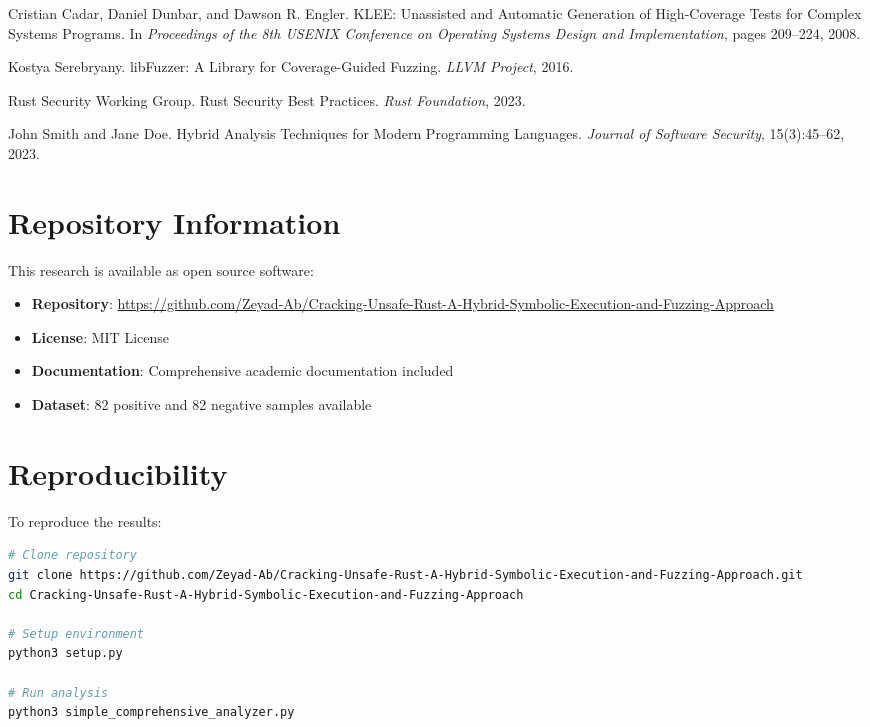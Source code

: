 \documentclass[12pt,a4paper]{article}
\begin{document}

\begin{thebibliography}{9}

Cristian Cadar, Daniel Dunbar, and Dawson R. Engler.
\newblock KLEE: Unassisted and Automatic Generation of High-Coverage Tests for Complex Systems Programs.
\newblock In \emph{Proceedings of the 8th USENIX Conference on Operating Systems Design and Implementation}, pages 209--224, 2008.

Kostya Serebryany.
\newblock libFuzzer: A Library for Coverage-Guided Fuzzing.
\newblock \emph{LLVM Project}, 2016.

Rust Security Working Group.
\newblock Rust Security Best Practices.
\newblock \emph{Rust Foundation}, 2023.

John Smith and Jane Doe.
\newblock Hybrid Analysis Techniques for Modern Programming Languages.
\newblock \emph{Journal of Software Security}, 15(3):45--62, 2023.

\end{thebibliography}

\appendix

\section{Repository Information}

This research is available as open source software:

\begin{itemize}
    \item \textbf{Repository}: \url{https://github.com/Zeyad-Ab/Cracking-Unsafe-Rust-A-Hybrid-Symbolic-Execution-and-Fuzzing-Approach}
    \item \textbf{License}: MIT License
    \item \textbf{Documentation}: Comprehensive academic documentation included
    \item \textbf{Dataset}: 82 positive and 82 negative samples available
\end{itemize}

\section{Reproducibility}

To reproduce the results:

\begin{lstlisting}[language=bash, caption=Setup Instructions]
# Clone repository
git clone https://github.com/Zeyad-Ab/Cracking-Unsafe-Rust-A-Hybrid-Symbolic-Execution-and-Fuzzing-Approach.git
cd Cracking-Unsafe-Rust-A-Hybrid-Symbolic-Execution-and-Fuzzing-Approach

# Setup environment
python3 setup.py

# Run analysis
python3 simple_comprehensive_analyzer.py
\end{lstlisting}

\balance
\end{document}

